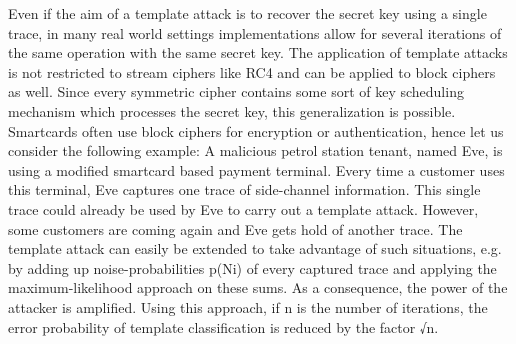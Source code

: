     Even if the aim of a template attack is to recover the secret key using a
    single trace, in many real world settings implementations allow for several
    iterations of the same operation with the same secret key. The application
    of template attacks is not restricted to stream ciphers like RC4 and can be
    applied to block ciphers as well. Since every symmetric cipher contains some
    sort of key scheduling mechanism which processes the secret key, this
    generalization is possible. Smartcards often use block ciphers for
    encryption or authentication, hence let us consider the following example: A
    malicious petrol station tenant, named Eve, is using a modified smartcard
    based payment terminal. Every time a customer uses this terminal, Eve
    captures one trace of side-channel information. This single trace could
    already be used by Eve to carry out a template attack. However, some
    customers are coming again and Eve gets hold of another trace. The template
    attack can easily be extended to take advantage of such situations, e.g. by
    adding up noise-probabilities p(Ni) of every captured trace and applying the
    maximum-likelihood approach on these sums. As a consequence, the power of
    the attacker is amplified. Using this approach, if n is the number of
    iterations, the error probability of template classification is reduced by
    the factor √n. 

